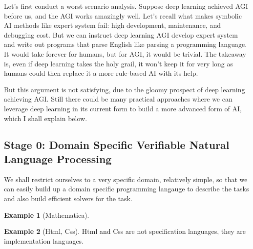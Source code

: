 \documentclass[11pt, oneside]{article}   	%
\theoremstyle{definition}
\newtheorem*{eg}{Example}
\begin{document}
{Let's first conduct a worst scenario analysis. Suppose deep learning achieved AGI before us, and the AGI works amazingly well. Let's recall what makes symbolic AI methods like expert system fail: high development, maintenance, and debugging cost. But we can instruct deep learning AGI develop expert system and write out programs that parse English like parsing a programming language. It would take forever for humans, but for AGI, it would be trivial. The takeaway is, even if deep learning takes the holy grail, it won't keep it for very long as humans could then replace it a more rule-based AI with its help.

But this argument is not satisfying, due to the gloomy prospect of deep learning achieving AGI. Still there could be many practical approaches where we can leverage deep learning in its current form to build a more advanced form of AI, which I shall explain below.

\subsection{Stage 0: Domain Specific Verifiable Natural Language Processing}

We shall restrict ourselves to a very specific domain, relatively simple, so that we can easily build up a domain specific programming langauge to describe the tasks and also build efficient solvers for the task.
\begin{center}
\end{center}

\begin{eg}
	[Mathematica]
\end{eg}

\begin{eg}
	[Html, Css] Html and Css are not specification languages, they are implementation languages.
\end{eg}

}
\end{document}
